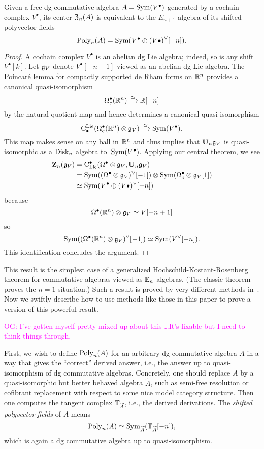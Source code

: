 \documentclass[11pt]{amsart}
\numberwithin{equation}{section}
\def\owen{\textcolor{magenta}{OG: }\textcolor{magenta}}
\begin{document}
\begin{prp}
Given a free dg commutative algebra $A = {\rm Sym}(V^\bullet)$ generated by a cochain complex $V^\bullet$,
its center ${\frak Z}_n(A)$ is equivalent to the $E_{n+1}$ algebra of its shifted polyvector fields 
\[
{\rm Poly}_n(A) = {\rm Sym}(V^\bullet \oplus (V\bullet)^\vee[-n]).
\]
\end{prp}

\begin{proof}
A cochain complex $V^\bullet$ is an abelian dg Lie algebra;
indeed, so is any shift $V^\bullet[k]$. 
Let $\mathfrak g_V$ denote $V^\bullet[-n+1]$ viewed as an abelian dg Lie algebra.
The Poincar\'e lemma for compactly supported de Rham forms on $\mathbb R^n$ provides a canonical quasi-isomorphism
\[
\Omega^\bullet_c(\mathbb R^n) \xrightarrow{\simeq} \mathbb R[-n]
\]
by the natural quotient map and hence determines a canonical quasi-isomorphism
\[
{\rm C}^{\rm Lie}_\bullet(\Omega^\bullet_c(\mathbb R^n) \otimes \mathfrak g_V) \xrightarrow{\simeq} {\rm Sym}(V^\bullet).
\]
This map makes sense on any ball in $\mathbb R^n$ and thus implies that $\mathbf U_n \mathfrak g_V$ is quasi-isomorphic as a ${\rm Disk}_n$ algebra to~${\rm Sym}(V^\bullet)$.
Applying our central theorem, we see
\begin{align*}
\mathbf Z_n(\mathfrak g_V) &= {\rm C}_{\rm Lie}^\bullet(\Omega^\bullet \otimes \mathfrak g_V, \mathbf U_n \mathfrak g_V) \\
&= {\rm Sym}((\Omega^\bullet \otimes \mathfrak g_V)^\vee[-1]) \otimes {\rm Sym}(\Omega^\bullet_c \otimes \mathfrak g_V[1])\\
& \simeq {\rm Sym}(V^\bullet \oplus (V\bullet)^\vee[-n])
\end{align*}
because
\[
\Omega^\bullet (\mathbb R^n) \otimes \mathfrak g_V \simeq V[-n+1]
\]
so
\[
{\rm Sym}( (\Omega^\bullet(\mathbb R^n) \otimes \mathfrak g_V)^\vee[-1]) \simeq {\rm Sym}( V^\vee[-n]).
\]
This identification concludes the argument.
\end{proof}

This result is the simplest case of a generalized Hochschild-Kostant-Rosenberg theorem for commutative algebras viewed as $\mathbb E_n$ algebras.
(The classic theorem proves the $n=1$ situation.)
Such a result is proved by very different methods in~\cite{CalWil, ToenBranes}.
Now we swiftly describe how to use methods like those in this paper to prove a version of this powerful result.

\owen{I've gotten myself pretty mixed up about this \dots It's fixable but I need to think things through.}

First, we wish to define ${\rm Poly}_n(A)$ for an arbitrary dg commutative algebra $A$ in a way that gives the ``correct'' derived answer, i.e., the answer up to quasi-isomorphism of dg commutative algebras.
Concretely, one should replace $A$ by a quasi-isomorphic but better behaved algebra $\widetilde{A}$, 
such as semi-free resolution or cofibrant replacement with respect to some nice model category structure.
Then one computes the tangent complex $\mathbb T_{\widetilde{A}}$, i.e., the derived derivations.
The {\em shifted polyvector fields} of $A$ means
\[
{\rm Poly}_n(A) \simeq {\rm Sym}_{\widetilde{A}} (\mathbb T_{\widetilde{A}}[-n]),
\]
which is again a dg commutative algebra up to quasi-isomorphism.
\end{document}
